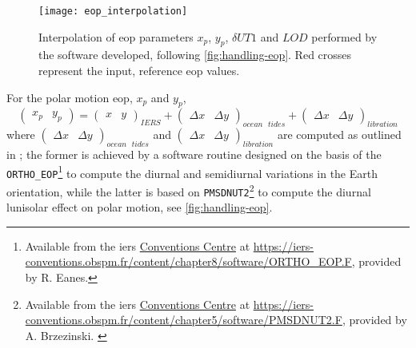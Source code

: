 \begin{figure}
  \centering
  \texttt{[image: eop\_interpolation]}
  \caption{Interpolation of \gls{eop} parameters $x_p$, $y_p$, $\delta UT1$ and $LOD$ 
      performed by the software developed, following \ref{fig:handling-eop}. Red crosses 
      represent the input, reference \gls{eop} values.}
  \label{fig:eop-interpolation-results}
\end{figure}

For the polar motion \gls{eop}, $x_p$ and $y_p$,
\begin{equation}
    \begin{pmatrix} x_p & y_p \end{pmatrix} = 
    \begin{pmatrix} x & y \end{pmatrix}_{IERS} + 
    \begin{pmatrix} \Delta x & \Delta y \end{pmatrix}_{ocean\text{ }tides} + 
    \begin{pmatrix} \Delta x & \Delta y \end{pmatrix}_{libration} 
\end{equation}
where $\begin{pmatrix} \Delta x & \Delta y \end{pmatrix}_{ocean\text{ }tides}$ 
and $\begin{pmatrix} \Delta x & \Delta y \end{pmatrix}_{libration}$ are computed as 
outlined in \cite{iers2010}; the former is achieved by a software routine designed 
on the basis of the \texttt{ORTHO\_EOP}\footnote{Available from the \gls{iers} \href{https://iers-conventions.obspm.fr/}{Conventions Centre} at \url{https://iers-conventions.obspm.fr/content/chapter8/software/ORTHO_EOP.F}, provided by R. Eanes.\label{fn:ortho-eop-f}} 
to compute the diurnal and semidiurnal variations in the Earth orientation, while the latter 
is based on \texttt{PMSDNUT2}\footnote{Available from the \gls{iers} \href{https://iers-conventions.obspm.fr/}{Conventions Centre} at \url{https://iers-conventions.obspm.fr/content/chapter5/software/PMSDNUT2.F}, provided by A. Brzezinski. \label{fn:pmsdnut2-f}}
to compute the diurnal lunisolar effect on polar motion, see \autoref{fig:handling-eop}.

